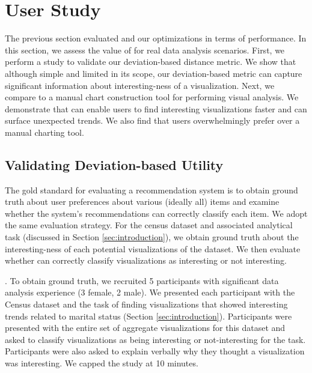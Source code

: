 
\section{User Study}
\label{sec:user_study}

The previous section evaluated \SeeDB and our optimizations in terms of 
performance.
In this section, we assess the value of \SeeDB for real data analysis 
scenarios.
First, we perform a study to validate our deviation-based distance metric.
We show that although simple and limited in its scope, our deviation-based
metric can capture significant information about interesting-ness
of a visualization.
Next, we compare \SeeDB to a manual chart construction tool for performing
visual analysis.
We demonstrate that \SeeDB can enable users to find interesting visualizations
faster and can surface unexpected trends.
We also find that users overwhelmingly prefer \SeeDB over a manual charting 
tool.

\subsection{Validating Deviation-based Utility}
\label{sec:validating_metric}
The gold standard for evaluating a recommendation system is to obtain ground 
truth about user preferences about
various (ideally all) items and examine whether the system's recommendations 
can correctly classify each item\cite{??}.
We adopt the same evaluation strategy.
For the census dataset and associated analytical task (discussed in Section 
\ref{sec:introduction}), we obtain ground truth about the interesting-ness of 
each potential visualizations of the dataset.
We then evaluate whether \SeeDB can correctly classify visualizations as
interesting or not interesting.

.
To obtain ground truth, we recruited 5 participants with significant data analysis 
experience (3 female, 2 male).
We presented each participant with the Census dataset and the task of finding visualizations
that showed interesting trends related to marital status (Section \ref{sec:introduction}).
Participants were presented with the entire set of aggregate visualizations 
for this dataset and asked to classify visualizations as being interesting or 
not-interesting for the task.
Participants were also asked to explain verbally why they thought a visualization
was interesting.
We capped the study at 10 minutes.

